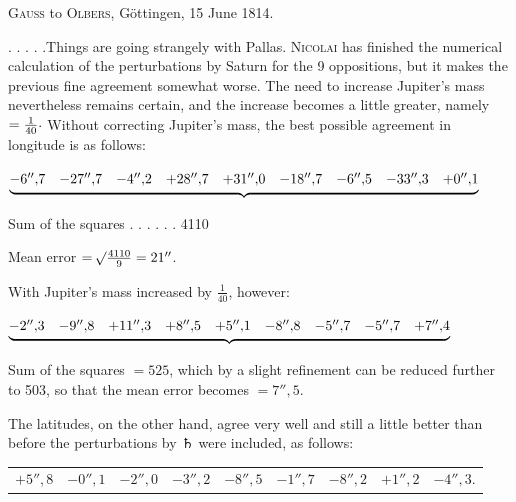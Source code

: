 \par{}\bigskip
\begin{center}
\textsc{Gauss} to \textsc{Olbers}, Göttingen, 15 June 1814.
\end{center}
\noindent\hspace*{\parindent}. . . . .\quad Things are going strangely with Pallas. \textsc{Nicolai} has finished the numerical calculation of the perturbations by Saturn for the 9 oppositions, but it makes the previous fine agreement somewhat worse. The need to increase Jupiter's mass nevertheless remains certain, and the increase becomes a little greater, namely \(=\frac{1}{40}\mathpunct{\raisebox{.3ex}{.}}\) Without correcting Jupiter's mass, the best possible agreement in longitude is as follows:
\begin{center}
\begingroup\small\setlength{\arraycolsep}{3pt}
\(\underbrace{\begin{array}{@{}rrrrrrrrr@{}}
-6''{,}7&-27''{,}7&-4''{,}2&+28''{,}7&+31''{,}0&-18''{,}7&-6''{,}5&-33''{,}3&+0''{,}1
\end{array}}\)\par
Sum of the squares . . . . . . 4110\par\smallskip
Mean error \(=\mathord{{}^{}\!\surd}\frac{4110}{9}=21''\).
\endgroup
\end{center}
\par With Jupiter's mass increased by \(\frac{1}{40}\), however:
\begin{center}
\begingroup\small\setlength{\arraycolsep}{3pt}
\(\underbrace{\begin{array}{@{}rrrrrrrrr@{}}
-2''{,}3&-9''{,}8&+11''{,}3&+8''{,}5&+5''{,}1&-8''{,}8&-5''{,}7&-5''{,}7&+7''{,}4
\end{array}}\)\par
Sum of the squares \(=525\), which by a slight refinement can be reduced further to 503, so that the mean error becomes \(=7''{,}5\).
\endgroup
\end{center}
\par The latitudes, on the other hand, agree very well and still a little better than before the perturbations by {\AstroSymbols ♄} were included, as follows:
\begin{center}
\begingroup\small\setlength{\tabcolsep}{3pt}
\begin{tabular}{@{}rrrrrrrrr@{}}
\(+5''{,}8\)&\(-0''{,}1\)&\(-2''{,}0\)&\(-3''{,}2\)&\(-8''{,}5\)\footnotemark&\(-1''{,}7\)&\(-8''{,}2\)&\(+1''{,}2\)&\(-4''{,}3\).
\end{tabular}
\endgroup
\end{center}
